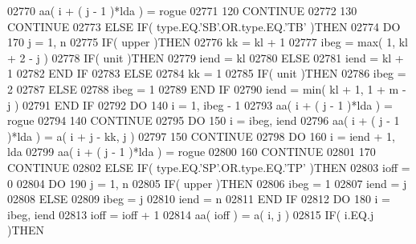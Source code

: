 \begin{DoxyCode}
02770                aa( i + ( j - 1 )*lda ) = rogue
02771   120       \textcolor{keywordflow}{CONTINUE}
02772   130    \textcolor{keywordflow}{CONTINUE}
02773       \textcolor{keywordflow}{ELSE} \textcolor{keywordflow}{IF}( type.EQ.\textcolor{stringliteral}{'SB'}.OR.type.EQ.\textcolor{stringliteral}{'TB'} )\textcolor{keywordflow}{THEN}
02774          \textcolor{keywordflow}{DO} 170 j = 1, n
02775             \textcolor{keywordflow}{IF}( upper )\textcolor{keywordflow}{THEN}
02776                kk = kl + 1
02777                ibeg = max( 1, kl + 2 - j )
02778                \textcolor{keywordflow}{IF}( unit )\textcolor{keywordflow}{THEN}
02779                   iend = kl
02780                \textcolor{keywordflow}{ELSE}
02781                   iend = kl + 1
02782 \textcolor{keywordflow}{               END IF}
02783             \textcolor{keywordflow}{ELSE}
02784                kk = 1
02785                \textcolor{keywordflow}{IF}( unit )\textcolor{keywordflow}{THEN}
02786                   ibeg = 2
02787                \textcolor{keywordflow}{ELSE}
02788                   ibeg = 1
02789 \textcolor{keywordflow}{               END IF}
02790                iend = min( kl + 1, 1 + m - j )
02791 \textcolor{keywordflow}{            END IF}
02792             \textcolor{keywordflow}{DO} 140 i = 1, ibeg - 1
02793                aa( i + ( j - 1 )*lda ) = rogue
02794   140       \textcolor{keywordflow}{CONTINUE}
02795             \textcolor{keywordflow}{DO} 150 i = ibeg, iend
02796                aa( i + ( j - 1 )*lda ) = a( i + j - kk, j )
02797   150       \textcolor{keywordflow}{CONTINUE}
02798             \textcolor{keywordflow}{DO} 160 i = iend + 1, lda
02799                aa( i + ( j - 1 )*lda ) = rogue
02800   160       \textcolor{keywordflow}{CONTINUE}
02801   170    \textcolor{keywordflow}{CONTINUE}
02802       \textcolor{keywordflow}{ELSE} \textcolor{keywordflow}{IF}( type.EQ.\textcolor{stringliteral}{'SP'}.OR.type.EQ.\textcolor{stringliteral}{'TP'} )\textcolor{keywordflow}{THEN}
02803          ioff = 0
02804          \textcolor{keywordflow}{DO} 190 j = 1, n
02805             \textcolor{keywordflow}{IF}( upper )\textcolor{keywordflow}{THEN}
02806                ibeg = 1
02807                iend = j
02808             \textcolor{keywordflow}{ELSE}
02809                ibeg = j
02810                iend = n
02811 \textcolor{keywordflow}{            END IF}
02812             \textcolor{keywordflow}{DO} 180 i = ibeg, iend
02813                ioff = ioff + 1
02814                aa( ioff ) = a( i, j )
02815                \textcolor{keywordflow}{IF}( i.EQ.j )\textcolor{keywordflow}{THEN}

\end{DoxyCode}
